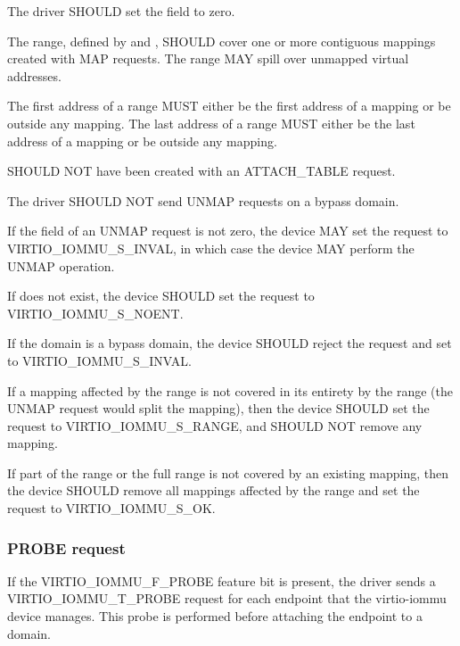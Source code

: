 The driver SHOULD set the  field to zero.

The range, defined by  and , SHOULD
cover one or more contiguous mappings created with MAP requests. The range
MAY spill over unmapped virtual addresses.

The first address of a range MUST either be the first address of a mapping
or be outside any mapping. The last address of a range MUST either be the
last address of a mapping or be outside any mapping.

 SHOULD NOT have been created with an ATTACH_TABLE
request.

The driver SHOULD NOT send UNMAP requests on a bypass domain.


If the  field of an UNMAP request is not zero, the device
MAY set the request  to VIRTIO_IOMMU_S_INVAL, in which case
the device MAY perform the UNMAP operation.

If  does not exist, the device SHOULD set the request
 to VIRTIO_IOMMU_S_NOENT.

If the domain is a bypass domain, the device SHOULD reject the
request and set  to VIRTIO_IOMMU_S_INVAL.

If a mapping affected by the range is not covered in its entirety by the
range (the UNMAP request would split the mapping), then the device SHOULD
set the request  to VIRTIO_IOMMU_S_RANGE, and SHOULD NOT
remove any mapping.

If part of the range or the full range is not covered by an existing
mapping, then the device SHOULD remove all mappings affected by the range
and set the request  to VIRTIO_IOMMU_S_OK.

\subsubsection{PROBE request}\label{sec:Device Types / IOMMU Device / Device operations / PROBE request}

If the VIRTIO_IOMMU_F_PROBE feature bit is present, the driver sends a
VIRTIO_IOMMU_T_PROBE request for each endpoint that the virtio-iommu
device manages. This probe is performed before attaching the endpoint to
a domain.

